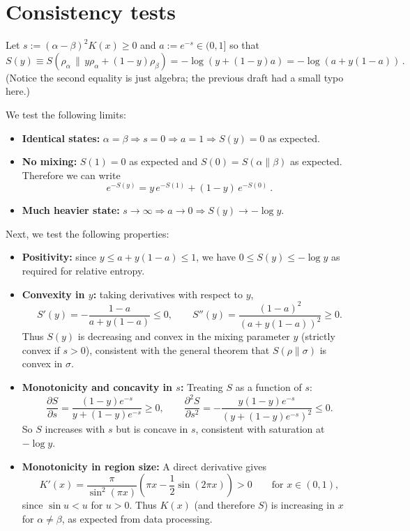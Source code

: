 \documentclass[11pt]{article}
\newcommand{\lb}{\left(}
\newcommand{\rb}{\right)}
\begin{document}
\section*{Consistency tests}
\label{sec:tests}

Let $s:=(\alpha-\beta)^2K(x)\ge 0$ and $a:=e^{-s}\in(0,1]$ so that
\begin{equation}
S(y)\equiv S\!\left(\rho_\alpha\,\Big\|\,y\rho_\alpha+(1-y)\rho_\beta\right)
=
-\log\!\lb y+(1-y)a\rb
=
-\log\!\lb a+y(1-a)\rb\,.
\end{equation}
(Notice the second equality is just algebra; the previous draft had a small typo here.)

We test the following limits:
\begin{itemize}
\item \textbf{Identical states:} $\alpha=\beta\Rightarrow s=0\Rightarrow a=1\Rightarrow S(y)=0$ as expected.
\item \textbf{No mixing:} $S(1)=0$ as expected and $S(0)=S(\alpha\|\beta)$ as expected. Therefore we can write
\begin{equation}
e^{-S(y)}=y\,e^{-S(1)}+(1-y)\,e^{-S(0)}\ .
\end{equation}
\item \textbf{Much heavier state:} $s\to\infty\Rightarrow a\to 0\Rightarrow S(y)\to -\log y$.
\end{itemize}

Next, we test the following properties:
\begin{itemize}
\item \textbf{Positivity:} since $y\le a+y(1-a)\le 1$, we have $0\le S(y)\le -\log y$ as required for relative entropy.
\item \textbf{Convexity in $y$:} taking derivatives with respect to $y$,
\begin{equation}
S'(y)= -\frac{1-a}{a+y(1-a)}\le 0,
\qquad
S''(y)=\frac{(1-a)^2}{(a+y(1-a))^2}\ge 0.
\end{equation}
Thus $S(y)$ is decreasing and convex in the mixing parameter $y$ (strictly convex if $s>0$),
consistent with the general theorem that $S(\rho\|\sigma)$ is convex in $\sigma$.

\item \textbf{Monotonicity and concavity in $s$:}
Treating $S$ as a function of $s$:
\begin{equation}
\frac{\partial S}{\partial s}=\frac{(1-y)e^{-s}}{y+(1-y)e^{-s}}\ge 0,
\qquad
\frac{\partial^2 S}{\partial s^2}
=-\frac{y(1-y)e^{-s}}{(y+(1-y)e^{-s})^2}\le 0.
\end{equation}
So $S$ increases with $s$ but is concave in $s$, consistent with saturation at $-\log y$.

\item \textbf{Monotonicity in region size:}
A direct derivative gives
\begin{equation}
K'(x)=\frac{\pi}{\sin^2(\pi x)}\left(\pi x-\frac12\sin(2\pi x)\right)>0
\qquad \text{for }x\in(0,1),
\end{equation}
since $\sin u<u$ for $u>0$. Thus $K(x)$ (and therefore $S$) is increasing in $x$ for $\alpha\neq\beta$, as expected from data processing.
\end{itemize}
\end{document}
